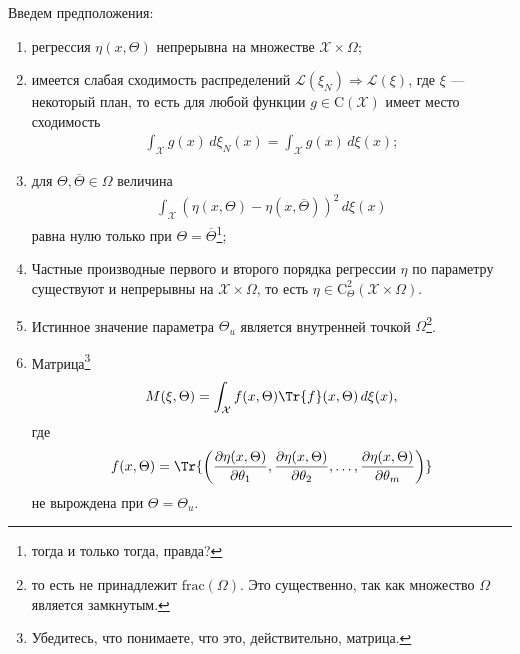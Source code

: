 Введем предположения:
\begin{enumerate}
    \item
    регрессия $\eta(x, \Theta)$ непрерывна на множестве $\mathcal X \times \Omega$;

    \item 
    имеется слабая сходимость распределений $\mathcal L(\xi_N) \Rightarrow \mathcal L(\xi)$, где $\xi$ --- некоторый план, то есть
    для любой функции $g \in \mathrm C(\mathcal X)$ имеет место сходимость
    \begin{gather*}
        \int_\mathcal X g(x)\, d \xi_N(x) = \int_\mathcal X g(x)\, d \xi(x);
    \end{gather*}

    \item 
    для $\Theta, \overline \Theta \in \Omega$ величина
    \begin{gather*}
        \int_\mathcal X \left(\eta(x, \Theta) - \eta(x, \overline \Theta)\right)^2\, d\xi(x)
    \end{gather*}
    равна нулю только при $\Theta = \overline \Theta$\footnote{тогда и только тогда, правда?};

    \item
    Частные производные первого и второго порядка регрессии $\eta$ по параметру существуют и непрерывны на $\mathcal X \times \Omega$,
    то есть $\eta \in \mathrm C_\Theta^2(\mathcal X \times \Omega)$.

    \item
    Истинное значение параметра $\Theta_u$ является внутренней точкой $\Omega$\footnote{то есть не принадлежит $\mathrm {frac}(\Omega)$.
    Это существенно, так как множество $\Omega$ является замкнутым.}.

    \item
    Матрица\footnote{Убедитесь, что понимаете, что это, действительно, матрица.}
    \begin{gather}
        M(\xi, \Theta) = \int_\mathcal X f(x, \Theta) \Tr{f}(x, \Theta)\, d\xi(x),
    \end{gather}
    где
    \begin{gather*}
        f(x, \Theta) = \Tr{\left(\frac{\partial \eta(x, \Theta)}{\partial \theta_1}, \frac{\partial \eta(x, \Theta)}{\partial \theta_2}, \ldots,
        \frac{\partial \eta(x, \Theta)}{\partial \theta_m}\right)}
    \end{gather*}
    не вырождена при $\Theta = \Theta_u$.
\end{enumerate}


